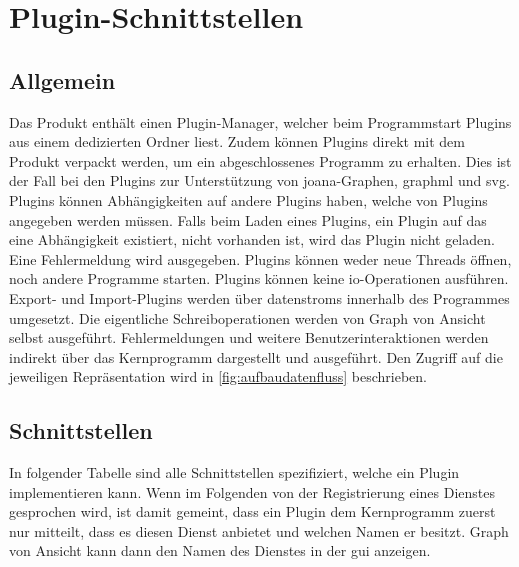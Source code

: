 \chapter{Plugin-Schnittstellen}
\label{ch:plugschnitt}

\setcounter{psnr}{10}
\newcommand{\psno}[1]{\subsubsection{#1}\addtocounter{psnr}{10}}
\renewcommand\thesubsubsection{/S\ifnum\value{psnr}<10 00\else\ifnum\value{psnr}<100 0\fi\fi\arabic{psnr}/}

\section{Allgemein}

Das Produkt enthält einen Plugin-Manager, welcher beim Programmstart Plugins aus einem dedizierten Ordner liest.
Zudem können Plugins direkt mit dem Produkt verpackt werden, um ein abgeschlossenes Programm zu erhalten.
Dies ist der Fall bei den Plugins zur Unterstützung von \gls{joana}-Graphen, \gls{graphml} und \gls{svg}.
Plugins können Abhängigkeiten auf andere Plugins haben, welche von Plugins angegeben werden müssen.
Falls beim Laden eines Plugins, ein Plugin auf das eine Abhängigkeit existiert, nicht vorhanden ist, wird das Plugin
nicht geladen. Eine Fehlermeldung wird ausgegeben.
Plugins können weder neue Threads öffnen, noch andere Programme starten. Plugins können keine \gls{io}-Operationen ausführen.
Export- und Import-Plugins werden über \glspl{datenstrom} innerhalb des Programmes umgesetzt. Die eigentliche Schreiboperationen
werden von Graph von Ansicht selbst ausgeführt. Fehlermeldungen und weitere Benutzerinteraktionen werden indirekt über das Kernprogramm dargestellt und ausgeführt. Den Zugriff auf die jeweiligen Repräsentation wird in \autoref{fig:aufbaudatenfluss} beschrieben.\\

\section{Schnittstellen}
In folgender Tabelle sind alle Schnittstellen spezifiziert, welche ein Plugin implementieren kann.
Wenn im Folgenden von der Registrierung eines Dienstes gesprochen wird, ist damit gemeint, dass ein Plugin dem Kernprogramm zuerst nur mitteilt, dass es diesen Dienst anbietet und welchen Namen er besitzt. Graph von Ansicht kann dann den Namen des Dienstes in der \gls{gui} anzeigen.

